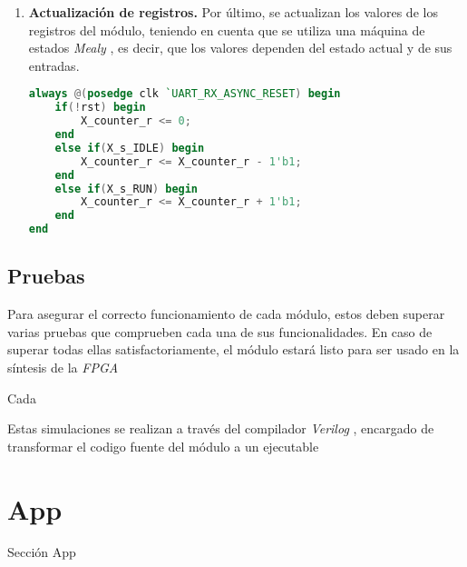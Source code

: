 \begin{enumerate}
    \item{\textbf{Actualización de registros.}} Por último, se actualizan los valores de los registros del módulo, teniendo en cuenta que se utiliza una máquina de estados \emph{Mealy} \cite{barkalov2005design}  , es decir, que los valores dependen del estado actual y de sus entradas.
    \begin{lstlisting}[language=Verilog,
        caption={Ejemplo de actualización de registros.},
        label=src:procedimientos-verilog-act-regs]
always @(posedge clk `UART_RX_ASYNC_RESET) begin
    if(!rst) begin
        X_counter_r <= 0;
    end
    else if(X_s_IDLE) begin
        X_counter_r <= X_counter_r - 1'b1;
    end
    else if(X_s_RUN) begin
        X_counter_r <= X_counter_r + 1'b1;
    end
end
    \end{lstlisting}
\end{enumerate}


\subsection{Pruebas}

Para asegurar el correcto funcionamiento de cada módulo, estos deben superar varias pruebas que comprueben cada una de sus funcionalidades. En caso de superar todas ellas satisfactoriamente, el módulo estará listo para ser usado en la síntesis de la \emph{FPGA}

Cada 

\cite{stuartsutherland2001}

Estas simulaciones se realizan a través del compilador \emph{Verilog} , encargado de transformar el codigo fuente del módulo a un ejecutable 


\section{App}
Sección App





